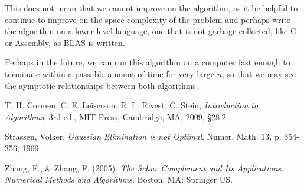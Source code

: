 \documentclass[12pt, letterpaper]{article}
\theoremstyle{remark}
\theoremstyle{remark}
\begin{document}
    This does not mean that we cannot improve on the algorithm, as it be helpful to continue to improve on the space-complexity of the problem and perhaps write the algorithm on a lower-level 
    language, one that is not garbage-collected, like C or Assembly, as BLAS is written.

    Perhaps in the future, we can run this algorithm on a computer fast enough to terminate within a passable amount of time for 
    very large \(n\), so that we may see the aymptotic relationships between both algorithms.
    
    \begin{thebibliography}{9}
        T. H. Cormen, C. E. Leiserson, R. L. Rivest, C. Stein, 
        \textit{Introduction to Algorithms}, 3rd ed., MIT Press, Cambridge, MA, 2009, §28.2.
         
        Strassen, Volker, 
        \textit{Gaussian Elimination is not Optimal}, Numer. Math. 13, p. 354-356, 1969
         
        Zhang, F., & Zhang, F. (2005). 
        \textit{The Schur Complement and Its Applications: Numerical Methods and Algorithms}. Boston, MA: Springer US.
    \end{thebibliography}
    
\end{document}
